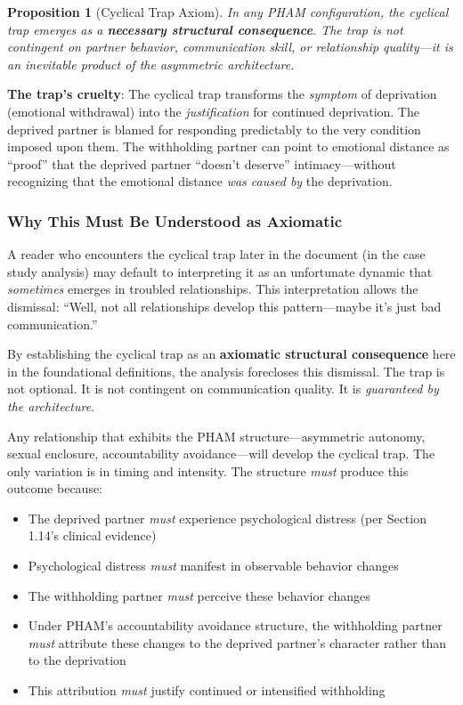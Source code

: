 \documentclass[12pt, letterpaper]{article}
\newtheorem{proposition}{Proposition}[section]
\begin{document}
\begin{proposition}[Cyclical Trap Axiom]
In any PHAM configuration, the cyclical trap emerges as a \textbf{necessary structural consequence}. The trap is not contingent on partner behavior, communication skill, or relationship quality---it is an inevitable product of the asymmetric architecture.
\end{proposition}

\textbf{The trap's cruelty}: The cyclical trap transforms the \textit{symptom} of deprivation (emotional withdrawal) into the \textit{justification} for continued deprivation. The deprived partner is blamed for responding predictably to the very condition imposed upon them. The withholding partner can point to emotional distance as ``proof'' that the deprived partner ``doesn't deserve'' intimacy---without recognizing that the emotional distance \textit{was caused by} the deprivation.

\subsubsection{Why This Must Be Understood as Axiomatic}

A reader who encounters the cyclical trap later in the document (in the case study analysis) may default to interpreting it as an unfortunate dynamic that \textit{sometimes} emerges in troubled relationships. This interpretation allows the dismissal: ``Well, not all relationships develop this pattern---maybe it's just bad communication.''

By establishing the cyclical trap as an \textbf{axiomatic structural consequence} here in the foundational definitions, the analysis forecloses this dismissal. The trap is not optional. It is not contingent on communication quality. It is \textit{guaranteed by the architecture}.

Any relationship that exhibits the PHAM structure---asymmetric autonomy, sexual enclosure, accountability avoidance---will develop the cyclical trap. The only variation is in timing and intensity. The structure \textit{must} produce this outcome because:

\begin{itemize}
    \item The deprived partner \textit{must} experience psychological distress (per Section 1.14's clinical evidence)
    \item Psychological distress \textit{must} manifest in observable behavior changes
    \item The withholding partner \textit{must} perceive these behavior changes
    \item Under PHAM's accountability avoidance structure, the withholding partner \textit{must} attribute these changes to the deprived partner's character rather than to the deprivation
    \item This attribution \textit{must} justify continued or intensified withholding
\end{itemize}
\end{document}
